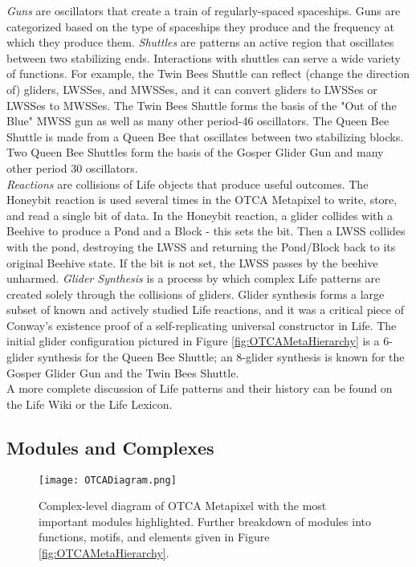 {\textit{Guns} are oscillators that create a train of regularly-spaced spaceships.  Guns are categorized based on the type of spaceships they produce and the frequency at which they produce them.  \textit{Shuttles} are patterns an active region that oscillates between two stabilizing ends.  Interactions with shuttles can serve a wide variety of functions.  For example, the Twin Bees Shuttle can reflect (change the direction of) gliders, LWSSes, and MWSSes, and it can convert gliders to LWSSes or LWSSes to MWSSes.  The Twin Bees Shuttle forms the basis of the "Out of the Blue" MWSS gun as well as many other period-46 oscillators.  The Queen Bee Shuttle  is made from a Queen Bee that oscillates between two stabilizing blocks.  Two Queen Bee Shuttles form the basis of the Gosper Glider Gun and many other period 30 oscillators.\\

\textit{Reactions} are collisions of Life objects that produce useful outcomes.  The Honeybit reaction is used several times in the OTCA Metapixel to write, store, and read a single bit of data.  In the Honeybit reaction, a glider collides with a Beehive to produce a Pond and a Block - this sets the bit.  Then a LWSS collides with the pond, destroying the LWSS and returning the Pond/Block back to its original Beehive state.  If the bit is not set, the LWSS passes by the beehive unharmed.  \textit{Glider Synthesis} is a process by which complex Life patterns are created solely through the collisions of gliders.  Glider synthesis forms a large subset of known and actively studied Life reactions, and it was a critical piece of Conway's existence proof of a self-replicating universal constructor in Life.  The initial glider configuration pictured in Figure \ref{fig:OTCAMetaHierarchy} is a 6-glider synthesis for the Queen Bee Shuttle; an 8-glider synthesis is known for the Gosper Glider Gun and the Twin Bees Shuttle.\\

A more complete discussion of Life patterns and their history can be found on the Life Wiki\cite{Authors2016} or the Life Lexicon\cite{Silver2016}.

\subsection{Modules and Complexes}

\begin{figure}
  \texttt{[image: OTCADiagram.png]}
  \caption{Complex-level diagram of OTCA Metapixel with the most important modules highlighted.  Further breakdown of modules into functions, motifs, and elements given in Figure \ref{fig:OTCAMetaHierarchy}.}
  \label{fig:OTCADiagram}
\end{figure}

}
